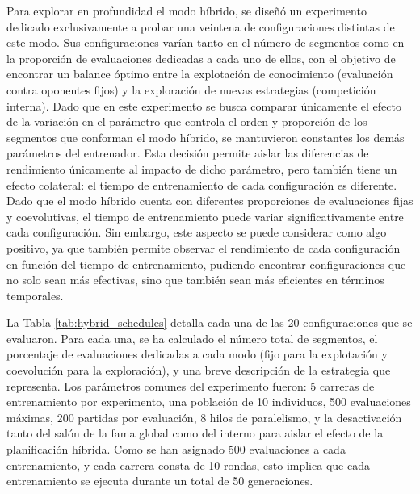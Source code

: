 Para explorar en profundidad el modo híbrido, se diseñó un experimento dedicado exclusivamente a probar una veintena de configuraciones distintas de este modo. Sus configuraciones varían tanto en el número de segmentos como en la proporción de evaluaciones dedicadas a cada uno de ellos, con el objetivo de encontrar un balance óptimo entre la explotación de conocimiento (evaluación contra oponentes fijos) y la exploración de nuevas estrategias (competición interna). Dado que en este experimento se busca comparar únicamente el efecto de la variación en el parámetro que controla el orden y proporción de los segmentos que conforman el modo híbrido, se mantuvieron constantes los demás parámetros del entrenador. Esta decisión permite aislar las diferencias de rendimiento únicamente al impacto de dicho parámetro, pero también tiene un efecto colateral: el tiempo de entrenamiento de cada configuración es diferente. Dado que el modo híbrido cuenta con diferentes proporciones de evaluaciones fijas y coevolutivas, el tiempo de entrenamiento puede variar significativamente entre cada configuración. Sin embargo, este aspecto se puede considerar como algo positivo, ya que también permite observar el rendimiento de cada configuración en función del tiempo de entrenamiento, pudiendo encontrar configuraciones que no solo sean más efectivas, sino que también sean más eficientes en términos temporales.

La Tabla \ref{tab:hybrid_schedules} detalla cada una de las 20 configuraciones que se evaluaron. Para cada una, se ha calculado el número total de segmentos, el porcentaje de evaluaciones dedicadas a cada modo (fijo para la explotación y coevolución para la exploración), y una breve descripción de la estrategia que representa. Los parámetros comunes del experimento fueron: 5 carreras de entrenamiento por experimento, una población de 10 individuos, 500 evaluaciones máximas, 200 partidas por evaluación, 8 hilos de paralelismo, y la desactivación tanto del salón de la fama global como del interno para aislar el efecto de la planificación híbrida. Como se han asignado 500 evaluaciones a cada entrenamiento, y cada carrera consta de 10 rondas, esto implica que cada entrenamiento se ejecuta durante un total de 50 generaciones.

